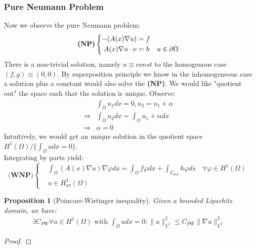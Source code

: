 \documentclass[a4paper,11pt,oneside,fleqn]{book}
\newtheorem{proposition}[theorem]{Proposition}
\theoremstyle{definition}
\theoremstyle{remark}
\let\div\relax
\DeclareMathOperator{\div}{div}
\begin{document}
\subsubsection{Pure Neumann Problem}
Now we observe the pure Neumann problem:
\begin{equation}
\textbf{(NP)}\left\{
\begin{aligned}
	-\div(A(x)\nabla u) &= f\\
	A(x)\nabla u \cdot \nu &= h \quad u \in \partial\Omega 
\end{aligned}	
\right.
\end{equation}
There is a non-trivial solution, namely $u \equiv const$ to the homogenous case $(f, g) \equiv (0, 0)$. By superposition principle we know in the inhomogeneous case a solution plus a constant would also solve the \textbf{(NP)}. We would like "quotient out" the space such that the solution is unique. Observe:
\begin{align*}
	&\int_\Omega u_1 dx = 0, u_2 = u_1 + \alpha\\
	\Rightarrow &\int_\Omega u_2 dx = \int_\Omega u_1 + \alpha dx\\
	\Rightarrow &\alpha = 0
\end{align*}
Intuitively, we would get an unique solution in the quotient space $H^1(\Omega)/ \{\int_\Omega u dx = 0\}$. \\
Integrating by parts yield:
\begin{equation}
\textbf{(WNP)}\left\{
\begin{aligned}
	&\int_\Omega (A(x) \nabla u) \nabla\varphi dx = \int_\Omega f\varphi dx + \int_{\Gamma_{neu}}h \varphi ds \quad \forall \varphi \in H^1(\Omega) \\
	& u \in H_{av}^1(\Omega)
\end{aligned}	
\right.
\end{equation}

\begin{proposition}[Poincare-Wirtinger inequality]
	Given a bounded Lipschitz domain, we have: 
	\begin{align*}
		\exists C_{PW} \forall u \in H^1(\Omega)\text{ with } \int_\Omega u dx = 0: \|u\|_{L^2}^2 \leq C_{PW} \|\nabla u\|_{L^2}^2
	\end{align*}
\end{proposition}
\begin{proof}
	
\end{proof}
\end{document}
